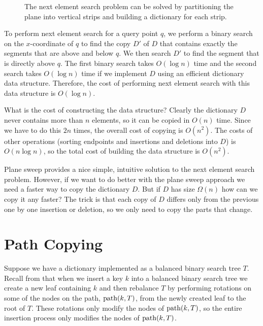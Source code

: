 \begin{figure}
\caption{The next element search problem can be solved by partitioning
the plane into vertical strips and building a dictionary for each strip.}
\end{figure}

To perform next element search for a query point $q$, we perform a
binary search on the $x$-coordinate of $q$ to find the copy $D'$ of
$D$ that contains exactly the segments that are above and below $q$.
We then search $D'$ to find the segment that is directly above $q$.
The first binary search takes $O(\log n)$ time and the second search
takes $O(\log n)$ time if we implement $D$ using an efficient
dictionary data structure.  Therefore, the cost of performing next
element search with this data structure is $O(\log n)$.

What is the cost of constructing the data structure?  Clearly the
dictionary $D$ never contains more than $n$ elements, so it can be
copied in $O(n)$ time.  Since we have to do this $2n$ times, the
overall cost of copying is $O(n^2)$.  The costs of other operations
(sorting endpoints and insertions and deletions into $D$) is $O(n\log
n)$, so the total cost of building the data structure is $O(n^2)$.

Plane sweep provides a nice simple, intuitive solution to the next
element search problem.  However, if we want to do better with the
plane sweep approach we need a faster way to copy the dictionary $D$.
But if $D$ has size $\Omega(n)$ how can we copy it any faster?  The
trick is that each copy of $D$ differs only from the previous one by
one insertion or deletion, so we only need to copy the parts that
change.

\section{Path Copying}

Suppose we have a dictionary implemented as a balanced binary search
tree $T$.  Recall from  that when we insert a key $k$
into a balanced binary search tree we create a new leaf containing $k$
and then rebalance $T$ by performing rotations on some of the nodes on
the path, $\mathrm{path}(k,T)$, from the newly created leaf to the root of
$T$.  These rotations only modify the nodes of $\mathrm{path}(k,T)$, so the
entire insertion process only modifies the nodes of $\mathrm{path}(k,T)$.

